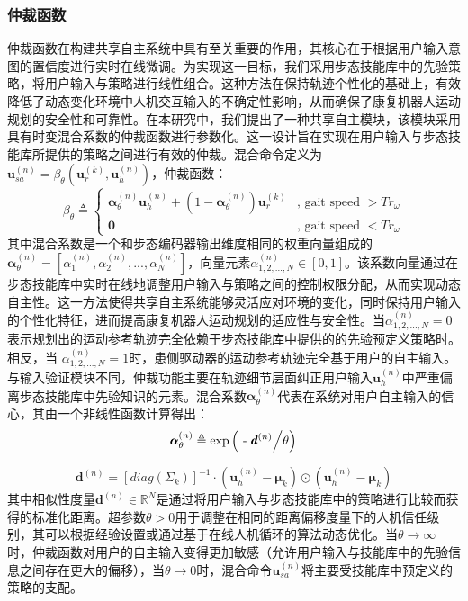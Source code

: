 \subsubsection{仲裁函数}仲裁函数在构建共享自主系统中具有至关重要的作用，其核心在于根据用户输入意图的置信度进行实时在线微调。为实现这一目标，我们采用步态技能库中的先验策略，将用户输入与策略进行线性组合。这种方法在保持轨迹个性化的基础上，有效降低了动态变化环境中人机交互输入的不确定性影响，从而确保了康复机器人运动规划的安全性和可靠性。在本研究中，我们提出了一种共享自主模块，该模块采用具有时变混合系数的仲裁函数进行参数化。这一设计旨在实现在用户输入与步态技能库所提供的策略之间进行有效的仲裁。混合命令定义为${\pmb{u}}_{sa}^{(n)} = {\beta _\theta }({\pmb{u}}_r^{(k)},{\pmb{u}}_h^{(n)})$，仲裁函数：
\begin{equation}
  \label{deqn_ex15}
  {\beta _\theta } \triangleq \left \{  {\begin{array}{*{20}{c}}
    {\pmb{\alpha }_\theta ^{(n)}{\pmb{u}}_h^{(n)} + \left( {1 - {\boldsymbol{\alpha }}_\theta ^{(n)}} \right){\pmb{u}}_r^{(k)}}&{{\text{, gait speed }}\pmb{ >  }T{r_\omega }}  \\  
    \pmb{0}&{{\text{, gait speed }}\pmb{ <  }T{r_\omega }} 
  \end{array}} \right.
\end{equation}    
其中混合系数是一个和步态编码器输出维度相同的权重向量组成的${\pmb{\alpha }}_\theta ^{(n)} = [\alpha _1^{(n)},\alpha _2^{(n)},...,\alpha _N^{(n)}]$，向量元素$\alpha _{1,2,...,N}^{(n)} \in [0,1]$。该系数向量通过在步态技能库中实时在线地调整用户输入与策略之间的控制权限分配，从而实现动态自主性。这一方法使得共享自主系统能够灵活应对环境的变化，同时保持用户输入的个性化特征，进而提高康复机器人运动规划的适应性与安全性。当$\alpha _{1,2,...,N}^{(n)} = 0$表示规划出的运动参考轨迹完全依赖于步态技能库中提供的的先验预定义策略时。相反，当    $\alpha _{1,2,...,N}^{(n)} = 1$时，患侧驱动器的运动参考轨迹完全基于用户的自主输入。与输入验证模块不同，仲裁功能主要在轨迹细节层面纠正用户输入${\pmb{u}}_h^{(n)}$中严重偏离步态技能库中先验知识的元素。混合系数${\pmb{\alpha }}_\theta ^{(n)}$代表在系统对用户自主输入的信心，其由一个非线性函数计算得出：
\begin{equation}
  \label{deqn_ex16}
  {\pmb{\alpha }}_\theta ^{(n)} \triangleq {\text{exp}}\left( {{\text{ - }}{{{\pmb{d}^{(n)}}} \mathord{\left/
 {\vphantom {{{\pmb{d}^{(n)}}} \theta }} \right.
 \kern-\nulldelimiterspace} \theta }} \right)
\end{equation} 

\begin{equation}
  \label{deqn_ex17}
  {\pmb{d}^{(n)}} = {\left[ {diag({{\Sigma _k}})} \right]^{ - 1}} \cdot \left( {\pmb{u}_h^{(n)} - {\pmb{\mu }_k}} \right) \odot \left( {\pmb{u}_h^{(n)} - {\pmb{\mu }_k}} \right)
\end{equation}
其中相似性度量${\pmb{d}^{(n)}} \in {\mathbb{R}^N}$是通过将用户输入与步态技能库中的策略进行比较而获得的标准化距离。超参数$\theta>0$用于调整在相同的距离偏移度量下的人机信任级别，其可以根据经验设置或通过基于在线人机循环的算法动态优化。当$\theta \to \infty$时，仲裁函数对用户的自主输入变得更加敏感（允许用户输入与技能库中的先验信息之间存在更大的偏移），当$\theta \to 0$时，混合命令${\pmb{u}}_{sa}^{(n)}$将主要受技能库中预定义的策略的支配。


